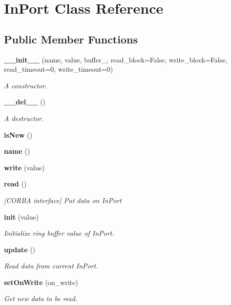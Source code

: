 \section{In\-Port Class Reference}
\label{classInPort}
\subsection*{Public Member Functions}
\begin{CompactItemize}
\item 
{\bf \_\-\_\-init\_\-\_\-} (name, value, buffer\_\-, read\_\-block=False, write\_\-block=False, read\_\-timeout=0, write\_\-timeout=0)
\begin{CompactList}\small\item\em A constructor. \item\end{CompactList}\item 
{\bf \_\-\_\-del\_\-\_\-} ()
\begin{CompactList}\small\item\em A destructor. \item\end{CompactList}\item 
{\bf is\-New} ()
\item 
{\bf name} ()
\item 
{\bf write} (value)
\item 
{\bf read} ()
\begin{CompactList}\small\item\em [CORBA interface] Put data on In\-Port \item\end{CompactList}\item 
{\bf init} (value)
\begin{CompactList}\small\item\em Initialize ring buffer value of In\-Port. \item\end{CompactList}\item 
{\bf update} ()
\begin{CompactList}\small\item\em Read data from current In\-Port. \item\end{CompactList}\item 
{\bf set\-On\-Write} (on\_\-write)
\begin{CompactList}\small\item\em Get new data to be read. \item\end{CompactList}\item 

\end{CompactItemize}
